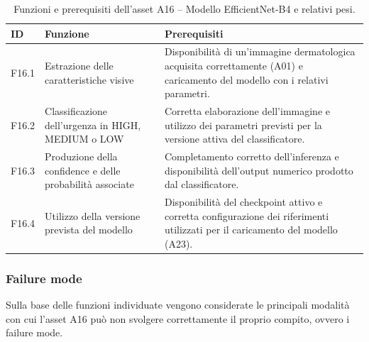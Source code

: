 \begin{table}[H]
    \centering
    \small
    \setlength{\tabcolsep}{4pt}
    \renewcommand{\arraystretch}{1.08}

    \begin{tabularx}{\textwidth}{
        >{\raggedright\arraybackslash}p{1.1cm}
        >{\raggedright\arraybackslash}p{3.8cm}
        X
    }
        \toprule

        \textbf{ID} &
        \textbf{Funzione} &
        \textbf{Prerequisiti} \\

        \midrule

        F16.1 &
        Estrazione delle caratteristiche visive &
        Disponibilità di un'immagine dermatologica acquisita correttamente
        (A01) e caricamento del modello con i relativi parametri. \\

        \midrule

        F16.2 &
        Classificazione dell'urgenza in HIGH, MEDIUM o LOW &
        Corretta elaborazione dell'immagine e utilizzo dei parametri
        previsti per la versione attiva del classificatore. \\

        \midrule

        F16.3 &
        Produzione della confidence e delle probabilità associate &
        Completamento corretto dell'inferenza e disponibilità dell'output
        numerico prodotto dal classificatore. \\

        \midrule

        F16.4 &
        Utilizzo della versione prevista del modello &
        Disponibilità del checkpoint attivo e corretta configurazione
        dei riferimenti utilizzati per il caricamento del modello (A23). \\

        \bottomrule
    \end{tabularx}

    \caption{Funzioni e prerequisiti dell'asset A16 -- Modello EfficientNet-B4 e relativi pesi.}
    \label{tab:a16-functions}
\end{table}


\subsubsection{Failure mode}

Sulla base delle funzioni individuate vengono considerate le principali
modalità con cui l'asset A16 può non svolgere correttamente il proprio
compito, ovvero i failure mode.

